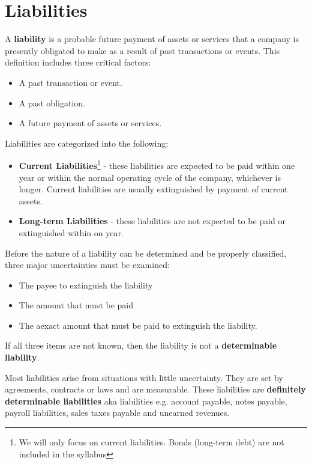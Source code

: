 \documentclass[../main.tex]{subfiles}
\begin{document}
	\section{Liabilities}
	
	A \textbf{liability} is a probable future payment of assets or services 
	that a company is presently obligated to make as a result of past 
	transactions or events. This definition includes three critical factors: 
	\begin{itemize}[noitemsep]
		\item A past transaction or event. 
		\item A past obligation.
		\item A future payment of assets or services. 
	\end{itemize}
	Liabilities are categorized into the following:
	\begin{itemize}[noitemsep]
		\item \textbf{Current Liabilities}\footnote{We will only focus on 
			current liabilities. Bonds (long-term debt) are not included in the 
			syllabus} - these liabilities are expected to 
		be paid within one year or within the normal operating cycle of the 
		company, whichever is longer. Current liabilities are usually 
		extinguished by payment of current assets. 
		\item \textbf{Long-term Liabilities} - these liabilities are not 
		expected to be paid or extinguished within on year.
	\end{itemize}
	
	Before the nature of a liability can be determined and be properly 
	classified, three major uncertainties must be examined:
	\begin{itemize}[noitemsep]
		\item The payee to extinguish the liability
		\item The amount that must be paid
		\item The aexact amount that must be paid to extinguish the liability.
	\end{itemize}
	If all three items are not known, then the liability is not a 
	\textbf{determinable liability}.
	
	Most liabilities arise from situations with little uncertainty. They are 
	set by agreements, contracts or laws and are measurable. These liabilities 
	are \textbf{definitely determinable liabilities} aka liabilities e.g. 
	account payable, notes payable, payroll liabilities, sales taxes payable 
	and unearned revenues.
	
\end{document}
